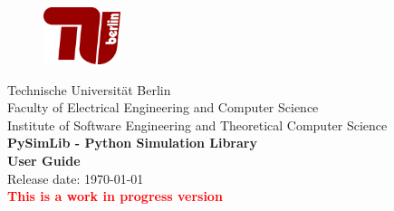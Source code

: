 \begin{figure}[t]
	\centering
	\includegraphics[width=0.2\textwidth]{images/TUB-logo}
	\vspace{1cm}
\end{figure}

\begin{center}
	\huge{Technische Universität Berlin}
	\\[1cm]
	
	\LARGE{Faculty of Electrical Engineering and Computer Science}
	\\[0.3cm]
	\LARGE{Institute of Software Engineering and Theoretical Computer Science}
	\\[2cm]
	
	\textbf{\Huge{PySimLib - Python Simulation Library}}
	\\[2cm]
	
	\textbf{\Huge{User Guide}}
	\\[3cm]
	
	Release date: \today
	\\
	\Huge{\textbf{\textcolor{red}{This is a work in progress version}}}
\end{center}
